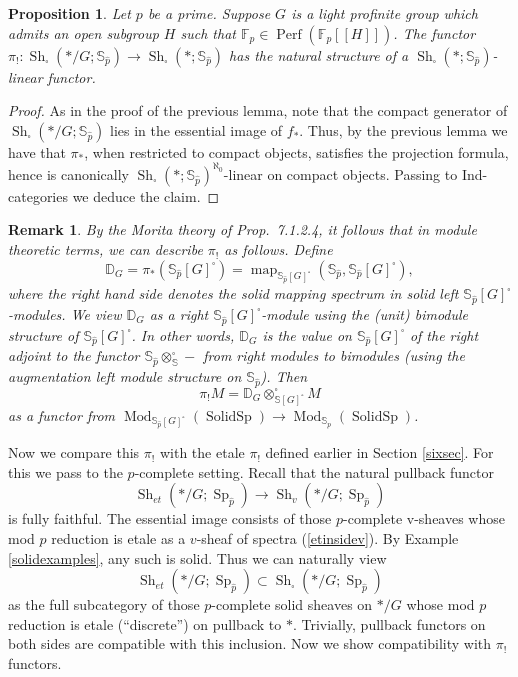 \documentclass[12pt]{article}
\newtheorem{proposition}[theorem]{Proposition}
\newtheorem{remark}[theorem]{Remark}
\newcommand{\on}{\operatorname}
\newcommand{\mbb}{\mathbb}
\newcommand{\solid}{\square}
\newcommand{\wh}{\widehat}
\begin{document}
\begin{proposition}
Let $p$ be a prime.  Suppose $G$ is a light profinite group which admits an open subgroup $H$ such that $\mathbb{F}_p\in \on{Perf}(\mathbb{F}_p[[H]])$.  The functor $\pi_!:\on{Sh}_\solid(\ast/G;\mbb{S}_{\wh{p}})\to\on{Sh}_\solid(\ast;\mbb{S}_{\wh{p}})$ has the natural structure of a $\on{Sh}_\solid(\ast;\mbb{S}_{\wh{p}})$-linear functor.
\end{proposition}
\begin{proof}
As in the proof of the previous lemma, note that the compact generator of $\on{Sh}_\solid(\ast/G;\mbb{S}_{\wh{p}})$ lies in the essential image of $f_\ast$. Thus, by the previous lemma we have that $\pi_\ast$, when restricted to compact objects, satisfies the projection formula, hence is canonically $\on{Sh}_\solid(\ast;\mbb{S}_{\wh{p}})^{\aleph_0}$-linear on compact objects.  Passing to Ind-categories we deduce the claim.
\end{proof}

\begin{remark}\label{moritaperspective}
By the Morita theory of \cite{LurieHA} Prop.\ 7.1.2.4, it follows that in module theoretic terms, we can describe $\pi_!$ as follows.  Define
$$\mathbb{D}_G=\pi_\ast(\mathbb{S}_{\wh{p}}[G]^\solid)=\on{map}_{\mathbb{S}_{\widehat{p}}[G]^\square}(\mathbb{S}_{\widehat{p}},\mathbb{S}_{\widehat{p}}[G]^\square),$$
where the right hand side denotes the solid mapping spectrum in solid left $\mathbb{S}_{\widehat{p}}[G]^\square$-modules.  We view $\mathbb{D}_G$ as a right $\mathbb{S}_{\widehat{p}}[G]^\square$-module using the (unit) bimodule structure of $\mathbb{S}_{\widehat{p}}[G]^\square$.  In other words, $\mathbb{D}_G$ is the value on $\mathbb{S}_{\widehat{p}}[G]^\square$ of the right adjoint to the functor $\mathbb{S}_{\widehat{p}}\otimes^\square_{\mathbb{S}}-$ from right modules to bimodules (using the augmentation left module structure on $\mathbb{S}_{\widehat{p}}$).  Then
$$\pi_!M = \mathbb{D}_G\otimes^\square_{\mathbb{S}[G]^\square}M$$
as a functor from $\on{Mod}_{\mbb{S}_{\wh{p}}[G]^\solid}(\on{SolidSp})\to\on{Mod}_{\mathbb{S}_{\wh{p}}}(\on{SolidSp})$.
\end{remark}

Now we compare this $\pi_!$ with the etale $\pi_!$ defined earlier in Section \ref{sixsec}.  For this we pass to the $p$-complete setting.  Recall that the natural pullback functor
$$\on{Sh}_{et}(\ast/G;\on{Sp}_{\wh{p}})\to\on{Sh}_v(\ast/G;\on{Sp}_{\wh{p}})$$
is fully faithful.  The essential image consists of those $p$-complete v-sheaves whose mod $p$ reduction is etale as a $v$-sheaf of spectra (\ref{etinsidev}).  By Example \ref{solidexamples}, any such is solid. Thus we can naturally view
$$\on{Sh}_{et}(\ast/G;\on{Sp}_{\wh{p}})\subset\on{Sh}_\solid(\ast/G;\on{Sp}_{\wh{p}})$$
as the full subcategory of those $p$-complete solid sheaves on $\ast/G$ whose mod $p$ reduction is etale (``discrete'') on pullback to $\ast$.  Trivially, pullback functors on both sides are compatible with this inclusion.  Now we show compatibility with $\pi_!$ functors.
\end{document}
